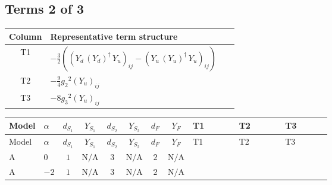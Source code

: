 \documentclass[8pt]{article}
\begin{document}
\begin{landscape}
\subsection*{Terms 2 of 3}
\begin{center}
\begin{tabular}{@{}c >{\raggedright\arraybackslash}p{0.82\linewidth}@{}}
\toprule
Column & Representative term structure \\
\midrule
T1 & \(\displaystyle -\frac{3}{2} (\left({Y_d}\,\left({Y_d}\right)^{\dagger}\,{Y_u}\right)_{ij}-\left({Y_u}\,\left({Y_u}\right)^{\dagger}\,{Y_u}\right)_{ij})\) \\
\midrule
T2 & \(\displaystyle -\frac{9}{4} {g_2}^2 \left({Y_u}\right)_{ij}\) \\
\midrule
T3 & \(\displaystyle -8 {g_3}^2 \left({Y_u}\right)_{ij}\) \\
\midrule
\bottomrule
\end{tabular}
\end{center}
\smallskip
\tiny
\begin{longtable}{@{}llcccccc >{\raggedright\arraybackslash}p{0.21\linewidth} >{\raggedright\arraybackslash}p{0.21\linewidth} >{\raggedright\arraybackslash}p{0.21\linewidth}@{}}
\toprule
Model & $\alpha$ & $d_{S_1}$ & $Y_{S_1}$ & $d_{S_2}$ & $Y_{S_2}$ & $d_F$ & $Y_F$ & T1 & T2 & T3 \\
\midrule
\endfirsthead
\toprule
Model & $\alpha$ & $d_{S_1}$ & $Y_{S_1}$ & $d_{S_2}$ & $Y_{S_2}$ & $d_F$ & $Y_F$ & T1 & T2 & T3 \\
\midrule
\endhead
A & $0$ & $1$ & $\text{N/A}$ & $3$ & $\text{N/A}$ & $2$ & $\text{N/A}$ & \scriptsize\adjustbox{max width=\linewidth}{$\begin{gathered} -\frac{3}{2} (\left({Y_d}\,\left({Y_d}\right)^{\dagger}\,{Y_u}\right)_{ij}-\left({Y_u}\,\left({Y_u}\right)^{\dagger}\,{Y_u}\right)_{ij})\end{gathered}$} & \scriptsize\adjustbox{max width=\linewidth}{$\begin{gathered} -\frac{9}{4} {g_2}^2 \left({Y_u}\right)_{ij}\end{gathered}$} & \scriptsize\adjustbox{max width=\linewidth}{$\begin{gathered} -8 {g_3}^2 \left({Y_u}\right)_{ij}\end{gathered}$} \\
\midrule
A & $-2$ & $1$ & $\text{N/A}$ & $3$ & $\text{N/A}$ & $2$ & $\text{N/A}$ & \scriptsize\adjustbox{max width=\linewidth}{$\begin{gathered} -\frac{3}{2} (\left({Y_d}\,\left({Y_d}\right)^{\dagger}\,{Y_u}\right)_{ij}-\left({Y_u}\,\left({Y_u}\right)^{\dagger}\,{Y_u}\right)_{ij})\end{gathered}$} & \scriptsize\adjustbox{max width=\linewidth}{$\begin{gathered} -\frac{9}{4} {g_2}^2 \left({Y_u}\right)_{ij}\end{gathered}$} & \scriptsize\adjustbox{max width=\linewidth}{$\begin{gathered} -8 {g_3}^2 \left({Y_u}\right)_{ij}\end{gathered}$} \\

\end{longtable}
\end{landscape}
\end{document}
